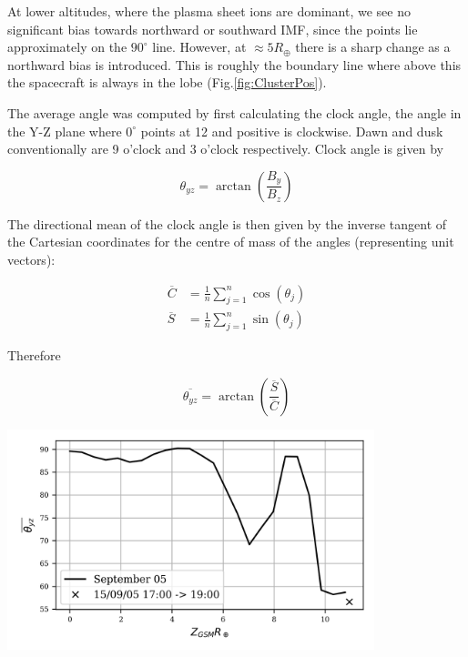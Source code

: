 \documentclass{article}
\newenvironment{Figure}
  {\par\medskip\noindent\minipage{\linewidth}}
  {\endminipage\par\medskip}
\begin{document}
\begin{multicols}{2}
At lower altitudes, where the plasma sheet ions are dominant, we see no significant bias towards northward or southward IMF, since the points lie approximately on the $90^\circ$ line. However, at $\approx 5R_\oplus$ there is a sharp change as a northward bias is introduced. This is roughly the boundary line where above this the spacecraft is always in the lobe (Fig.\ref{fig:ClusterPos}).

The average angle was computed by first calculating the clock angle, the angle in the Y-Z plane where $0^\circ$ points at 12 and positive is clockwise. Dawn and dusk conventionally are 9 o'clock and 3 o'clock respectively. Clock angle is given by

\begin{equation}
    \theta_{yz} = \arctan \left(\frac{B_y}{B_z}\right)
\end{equation}

The directional mean of the clock angle is then given by the inverse tangent of the Cartesian coordinates for the centre of mass of the angles (representing unit vectors):

\begin{align}
    \overline{C} &= \frac{1}{n}\sum_{j=1}^n \cos (\theta_j) \\
    \overline{S} &= \frac{1}{n}\sum_{j=1}^n \sin (\theta_j)
\end{align}

\noindent Therefore

\begin{equation}
    \overline{\theta_{yz}} = \arctan \left(\frac{\overline{S}}{\overline{C}}\right)
\end{equation}

\begin{Figure}
    \centering
    \includegraphics[width=0.8\textwidth]{imf_radius.png}
    \label{fig:imf_radius}
\end{Figure}


\end{multicols}
\end{document}

